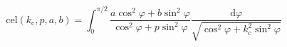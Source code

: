 \documentclass{article}
\begin{document}
\thispagestyle{empty}

\begin{equation*}
\mathrm{cel}(k_\mathrm{c}, p, a, b) =
 \int_0^{\pi/2} \frac{a \cos^2{\varphi} + b \sin^2{\varphi}}
                     {  \cos^2{\varphi} + p \sin^2{\varphi}}
                \frac{\mathrm{d}\varphi}
                     {\sqrt{\cos^2{\varphi} + k_\mathrm{c}^2 \sin^2{\varphi}}}
\end{equation*}
\end{document}
